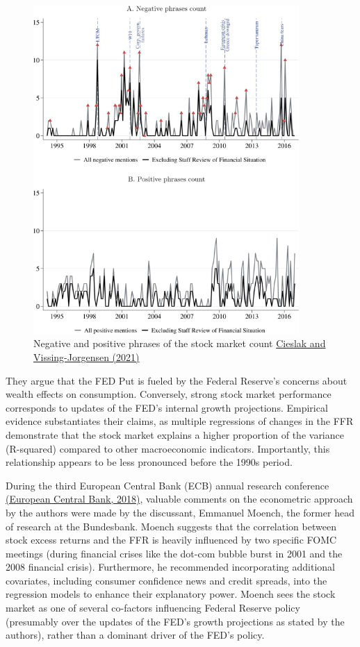 \begin{figure}[h]
    \centering
        \label{cies21_fig5}
    \includegraphics[width=0.9\textwidth]{figures/cies21/Figure5}
    \caption{Negative and positive phrases of the stock market count \hyperref[item:cieslak_economics_2021]{Cieslak and Vissing-Jorgensen (2021)}}
\end{figure}

They argue that the FED Put is fueled by the Federal Reserve's concerns about wealth effects on consumption. Conversely, strong stock market performance corresponds to updates of the FED’s internal growth projections. Empirical evidence substantiates their claims, as multiple regressions of changes in the FFR demonstrate that the stock market explains a higher proportion of the variance (R-squared) compared to other macroeconomic indicators. Importantly, this relationship appears to be less pronounced before the 1990s period.  

During the third European Central Bank (ECB) annual research conference \hyperref[item:european_central_bank_third_2018]{ (European Central Bank,  2018)}, valuable comments on the econometric approach by the authors were made by the discussant, Emmanuel Moench, the former head of research at the Bundesbank. Moench suggests that the correlation between stock excess returns and the FFR is heavily influenced by two specific FOMC meetings (during financial crises like the dot-com bubble burst in 2001 and the 2008 financial crisis). Furthermore, he recommended incorporating additional covariates, including consumer confidence news and credit spreads, into the regression models to enhance their explanatory power. Moench sees the stock market as one of several co-factors influencing Federal Reserve policy (presumably over the updates of the FED's growth projections as stated by the authors), rather than a dominant driver of the FED's policy.

